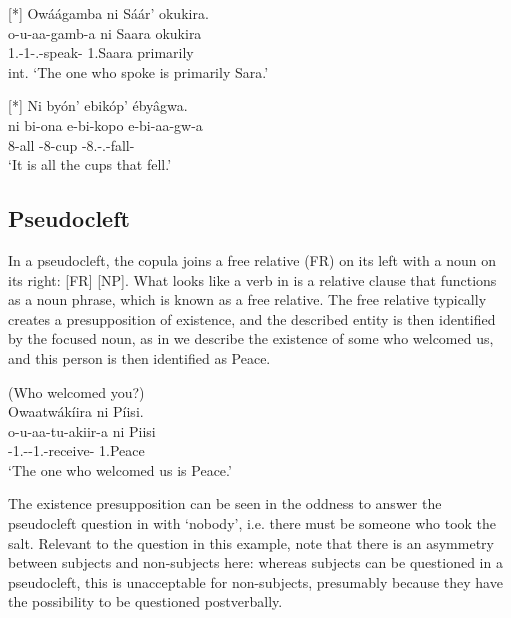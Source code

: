 \documentclass[output=paper]{langscibook}
\begin{document}
\ex
[*]{
\label{bkm:Ref98944693}
Owáágamba ni Sáár’ okukira.\\
\gll
o-u-aa-gamb-a  ni  Saara  okukira\\
1\SM{}.\REL{}-1\SM{}-\N{}.\PST{}-speak-\FV{}  \COP{}  1.Saara  primarily\\
\glt
int. ‘The one who spoke is primarily Sara.’\\
}

\z
\ea
[*]{
\label{bkm:Ref135726145}
Ni byón’ ebikóp’ ébyâgwa.\\
\gll
ni  bi-ona  e-bi-kopo  e-bi-aa-gw-a\\
\COP{}  8-all   \AUG{}-8-cup  \AUG{}-8\SM{}.\REL{}-\N{}.\PST{}-fall-\FV{}\\
\glt
‘It is all the cups that fell.’\\
}


\z


\subsection{Pseudocleft}

In a pseudocleft, the copula joins a free relative (FR) on its left with a noun on its right: [FR] \COP{} [NP]. What looks like a verb in  is a relative clause that functions as a noun phrase, which is known as a free relative. The free relative typically creates a presupposition of existence, and the described entity is then identified by the focused noun, as in  we describe the existence of some who welcomed us, and this person is then identified as Peace.

\ea
\label{bkm:Ref98945724}
(Who welcomed you?)\\
Owaatwákíira ni Píisi.\\
\gll
o-u-aa-tu-akiir-a  ni  Piisi\\
\AUG{}-1\SM{}.\REL{}-\PST{}-1\PL{}.\OM{}-receive-\FV{}  \COP{}  1.Peace\\
\glt
‘The one who welcomed us is Peace.’\\


\z

The existence presupposition can be seen in the oddness to answer the pseudocleft question in  with ‘nobody’, i.e. there must be someone who took the salt. Relevant to the question in this example, note that there is an asymmetry between subjects and non-subjects here: whereas subjects can be questioned in a pseudocleft, this is unacceptable for non-subjects, presumably because they have the possibility to be questioned postverbally.
\end{document}
